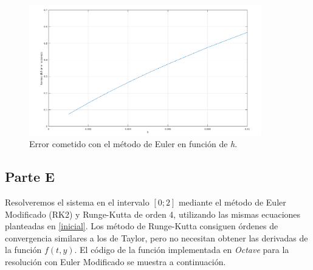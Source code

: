 \documentclass[titlepage,a4paper]{article}
\begin{document}
	\begin{figure}[H]
		\centering
		\includegraphics[width=0.9\textwidth]{error_euler.png}
		\caption{\label{fig:error_euler}Error cometido con el método de Euler en función de \emph{h}.}
	\end{figure}
	

	\subsection{Parte E}\label{sec:parteE}
	Resolveremos el sistema en el intervalo $[0; 2]$ mediante el método de Euler Modificado (RK2) y Runge-Kutta de orden 4, utilizando las mismas ecuaciones planteadas en \ref{inicial}. Los método de Runge-Kutta consiguen órdenes de convergencia similares a los de Taylor, pero no necesitan obtener las derivadas de la función $ f(t, y) $.
	El código de la función implementada en \emph{Octave} para la resolución con Euler Modificado se muestra a continuación.
	
\end{document}
